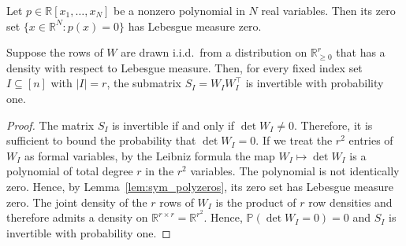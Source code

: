 \documentclass{article}
\begin{document}
\begin{lemma}
\label{lem:sym_polyzeros}
Let $p \in \mathbb{R}[x_1, \dots, x_N]$ be a nonzero polynomial in $N$ real variables. Then its zero set $\{x \in \mathbb{R}^N : p(x) = 0\}$ has Lebesgue measure zero.
\end{lemma}




\begin{lemma}
\label{lem:sym_invertible}
Suppose the rows of $W$ are drawn i.i.d.\ from a distribution on $\mathbb{R}^r_{\geq 0}$ that has a density with respect to Lebesgue measure. Then, for every fixed index set $I \subseteq [n]$ with $|I| = r$, the submatrix $S_I = W_I W_I^\top$ is invertible with probability one.
\end{lemma}

\begin{proof}
The matrix $S_I$ is invertible if and only if $\det W_I \neq 0$. Therefore, it is sufficient to bound the probability that $\det W_I = 0$. If we treat the $r^2$ entries of $W_I$ as formal variables, by the Leibniz formula the map $W_I \mapsto \det W_I$ is a polynomial of total degree $r$ in the $r^2$ variables. The polynomial is not identically zero. Hence, by Lemma~\ref{lem:sym_polyzeros}, its zero set has Lebesgue measure zero. The joint density of the $r$ rows of $W_I$ is the product of $r$ row densities and therefore admits a density on $\mathbb{R}^{r \times r} = \mathbb{R}^{r^2}$. Hence, $\mathbb{P}(\det W_I = 0) = 0$ and $S_I$ is invertible with probability one.
\end{proof}
\end{document}
